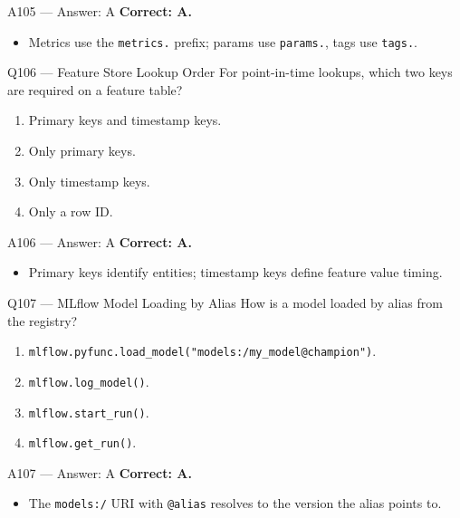 \documentclass[aspectratio=169,9pt]{beamer}
\begin{document}
	\begin{frame}{A105 --- Answer: A}
		\textbf{Correct: A.}
		\begin{itemize}
			\item Metrics use the \texttt{metrics.} prefix; params use \texttt{params.}, tags use \texttt{tags.}.
		\end{itemize}
	\end{frame}
	
	\begin{frame}{Q106 --- Feature Store Lookup Order}
		For point-in-time lookups, which two keys are required on a feature table?
		\begin{enumerate}[label=\Alph*.]
			\item Primary keys and timestamp keys.
			\item Only primary keys.
			\item Only timestamp keys.
			\item Only a row ID.
		\end{enumerate}
	\end{frame}
	
	\begin{frame}{A106 --- Answer: A}
		\textbf{Correct: A.}
		\begin{itemize}
			\item Primary keys identify entities; timestamp keys define feature value timing.
		\end{itemize}
	\end{frame}
	
	\begin{frame}{Q107 --- MLflow Model Loading by Alias}
		How is a model loaded by alias from the registry?
		\begin{enumerate}[label=\Alph*.]
			\item \texttt{mlflow.pyfunc.load\_model("models:/my\_model@champion")}.
			\item \texttt{mlflow.log\_model()}.
			\item \texttt{mlflow.start\_run()}.
			\item \texttt{mlflow.get\_run()}.
		\end{enumerate}
	\end{frame}
	
	\begin{frame}{A107 --- Answer: A}
		\textbf{Correct: A.}
		\begin{itemize}
			\item The \texttt{models:/} URI with \texttt{@alias} resolves to the version the alias points to.
		\end{itemize}
	\end{frame}
	
\end{document}
